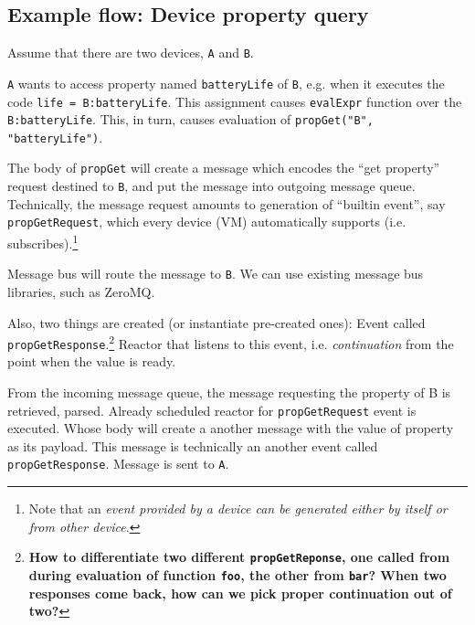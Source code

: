 \documentclass{note}
\begin{document}
{\subsection{Example flow: Device property query}
Assume that there are two devices, \textcolor{red2}{\texttt{A}} and 
   \textcolor{red2}{\texttt{B}}. 

\ben
\w {}

\ben
\w \textcolor{red2}{\texttt{A}} wants to access property named
\textcolor{red2}{\texttt{batteryLife}} of \textcolor{red2}{\texttt{B}},
e.g. when it executes the code \textcolor{red2}{\texttt{life =
    B:batteryLife}}. 
\w This assignment causes \textcolor{red2}{\texttt{evalExpr}}
  function over the \textcolor{red2}{\texttt{B:batteryLife}}. This, in turn, 
  causes evaluation of \textcolor{red2}{\texttt{propGet("B", "batteryLife")}}.

\w The body of \textcolor{red2}{\texttt{propGet}} will create a
\textcolor{blue2}{message} which encodes the ``get property'' request destined
to \textcolor{red2}{\texttt{B}}, and put the message into outgoing message
queue. Technically, the message request amounts to generation of
\textcolor{blue2}{``builtin event''}, say
\textcolor{red2}{\texttt{propGetRequest}}, 
which every device (VM) automatically supports
(i.e. subscribes).\footnote{Note that an {\em event provided by a device can
    be generated either by itself or from other device\/}.}

\w Message bus will route the message to \textcolor{red2}{\texttt{B}}. We can
use existing message bus libraries, such as ZeroMQ.

\w Also, two things are created (or instantiate pre-created ones):
   \bit 
   \w Event called \textcolor{red2}{\tt{}propGetResponse}.\footnote{\bf How to differentiate two
     different \textcolor{red2}{\texttt{propGetReponse}}, one called from
     during evaluation of function \textcolor{red2}{\texttt{foo}}, the other
     from \textcolor{red2}{\texttt{bar}}? When two responses come back, how
     can we pick proper continuation out of two?}
   \w Reactor that listens to this event, i.e. {\em continuation\/} from the
   point when  the value is ready.
   \eit
\een

\w {}
\ben
\w From the incoming message queue, the message requesting the property of
   B is retrieved, parsed.
\w Already scheduled reactor for \textcolor{red2}{\texttt{propGetRequest}} event
   is executed. Whose body will create a another message with the value of
   property as its payload. This message is technically an another event
   called \textcolor{red2}{\texttt{propGetResponse}}. 
\w Message is sent to \textcolor{red2}{\texttt{A}}.
\een

}
\end{document}
